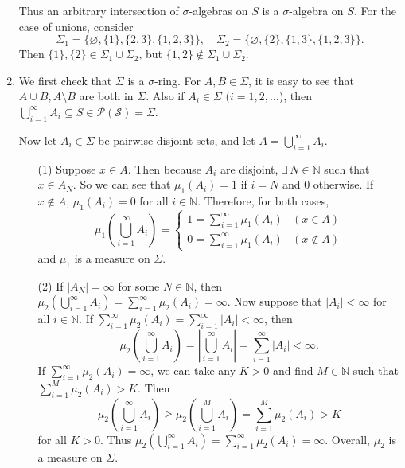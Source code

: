 \documentclass[12pt]{report}
\newcommand{\numl}[1]{\item[\large\textbf{\sffamily #1.}]}
\newcommand{\mc}[1]{\mathcal{#1}}
\newcommand{\bs}{\setminus}
\renewcommand{\subset}{\subseteq}
\newcommand{\abs}[1]{\left| #1 \right|}
\newcommand{\paren}[1]{\left( #1 \right)}
\newcommand{\N}{\mathbb{N}}
\let\oldexists\exists
\renewcommand{\exists}{\oldexists\,}
\begin{document}
\begin{enumerate}
    Thus an arbitrary intersection of \(\sigma\)-algebras on \(S\) is a \(\sigma\)-algebra on \(S\). For the case of unions, consider
    \[
        \Sigma_1 = \{\varnothing, \{1\}, \{2, 3\}, \{1, 2, 3\}\}, \quad \Sigma_2 = \{\varnothing, \{2\}, \{1, 3\}, \{1, 2, 3\}\}.
    \]
    Then \(\{1\}, \{2\} \in \Sigma_1 \cup \Sigma_2\), but \(\{1, 2\}\notin \Sigma_1\cup \Sigma_2\).

    \numl{4} We first check that \(\Sigma\) is a \(\sigma\)-ring. For \(A, B \in \Sigma\), it is easy to see that \(A\cup B, A\bs B\) are both in \(\Sigma\). Also if \(A_i \in \Sigma\) (\(i = 1, 2, \dots\)), then \(\bigcup_{i=1}^\infty A_i \subset S \in \mc{P(S)} = \Sigma\).

    Now let \(A_i \in \Sigma\) be pairwise disjoint sets, and let \(A = \bigcup_{i=1}^\infty A_i\).
    \begin{enumerate}
        \item[(1)] Suppose \(x \in A\). Then because \(A_i\) are disjoint, \(\exists N \in \N\) such that \(x \in A_N\). So we can see that \(\mu_1(A_i) = 1\) if \(i = N\) and 0 otherwise. If \(x \notin A\), \(\mu_1(A_i) = 0\) for all \(i\in \N\). Therefore, for both cases,
            \[
                \mu_1\paren{\bigcup_{i=1}^\infty A_i} = \begin{cases}
                    1 = \sum_{i=1}^\infty \mu_1(A_i) & (x \in A)    \\
                    0 = \sum_{i=1}^\infty \mu_1(A_i) & (x \notin A)
                \end{cases}
            \]
            and \(\mu_1\) is a measure on \(\Sigma\).
        \item[(2)] If \(\abs{A_N} = \infty\) for some \(N \in \N\), then \(\mu_2\paren{\bigcup_{i=1}^\infty A_i} = \sum_{i=1}^\infty \mu_2(A_i) = \infty\). Now suppose that \(\abs{A_i} < \infty\) for all \(i \in \N\). If \(\sum_{i=1}^\infty \mu_2(A_i) = \sum_{i=1}^\infty \abs{A_i} < \infty\), then
            \[
                \mu_2\paren{\bigcup_{i=1}^\infty A_i} = \abs{\bigcup_{i=1}^\infty A_i} = \sum_{i=1}^\infty \abs{A_i} < \infty.
            \]
            If \(\sum_{i=1}^\infty \mu_2(A_i) = \infty\), we can take any \(K > 0\) and find \(M \in \N\) such that \(\sum_{i=1}^M \mu_2(A_i) > K\). Then
            \[
                \mu_2\paren{\bigcup_{i=1}^\infty A_i} \geq \mu_2\paren{\bigcup_{i=1}^M A_i} = \sum_{i=1}^M \mu_2(A_i) > K
            \]
            for all \(K > 0\). Thus \(\mu_2(\bigcup_{i=1}^\infty A_i) = \sum_{i=1}^\infty \mu_2(A_i) = \infty\). Overall, \(\mu_2\) is a measure on \(\Sigma\).
    \end{enumerate}


\end{enumerate}
\end{document}
